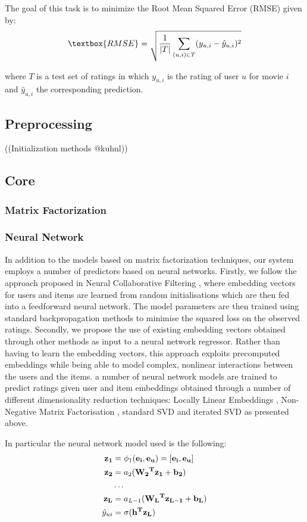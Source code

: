 \documentclass[10pt,conference,compsocconf]{IEEEtran}
\begin{document}
The goal of this task is to minimize the Root Mean Squared Error (RMSE) given by:
\begin{equation}
\textbox{RMSE} = \sqrt{\frac{1}{|T|}\sum_{(u, i) \in T} (y_{u,i} -\hat y_{u,i})^2}    
\end{equation}

where $T$ is a test set of ratings in which $y_{u, i}$ is the rating of user $u$ for movie $i$ and $\hat y_{u,i}$ the corresponding prediction. 

\subsection{Preprocessing}

((Initialization methods @kuhnl))

\subsection{Core}
\subsubsection{Matrix Factorization}
\subsubsection{Neural Network}
In addition to the models based on matrix factorization techniques, our system employs a number of predictors based on neural networks. Firstly, we follow the approach proposed in Neural Collaborative Filtering \cite{he2017neural}, where embedding vectors for users and items are learned from random initialisations which are then fed into a feedforward neural network. The model parameters are then trained using standard backpropagation methods to minimise the squared loss on the observed ratings. 
Secondly, we propose the use of existing embedding vectors obtained through other methods as input to a neural network regressor. Rather than having to learn the embedding vectors, this approach exploits precomputed embeddings while being able to model complex, nonlinear interactions  between the users and the items. 
a number of neural network models are trained to predict ratings given user and item embeddings obtained through a number of different dimensionality reduction techniques: Locally Linear Embeddings \cite{roweis2000nonlinear}, Non-Negative Matrix Factorisation \cite{cichocki2009fast}, standard SVD and iterated SVD as presented above.

In particular the neural network model used is the following:
\begin{equation}
\begin{aligned}
    \bf{z_1} &= \phi_1(\bf{e_i}, \bf{e_u}) = [\bf{e_i}, \bf{e_u}]\\
    \bf{z_2} &= a_2(\bf{W_2}^T \bf{z_1} + b_2) \\
    &\dots \\
    \bf{z_L} &= a_{L - 1 }(\bf{W_{L}}^T \bf{z_{L - 1}} + b_L) \\
    \hat y_{ui} &= \sigma(\bf{h}^T \bf{z_L})
\end{aligned}
\end{equation}
\end{document}

